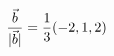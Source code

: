 \documentclass[preview]{standalone}
\begin{document}
\begin{align*}
\special{dvisvgm:raw <g id='unique000'>}\dfrac{\vec b}{|\vec b|}=\dfrac{1}{3}(-2,1,2)\special{dvisvgm:raw </g>}
\end{align*}
\end{document}
